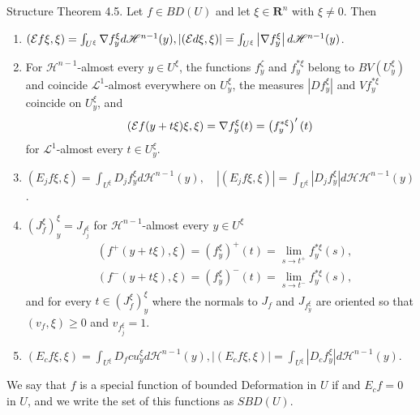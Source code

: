 \begin{theorem}
Structure Theorem 4.5. Let $f \in B D(U)$ and let $\xi \in \mathbf{R}^n$ with $\xi \neq 0$. Then
\begin{enumerate}
\item $\left( {\mathcal E} f \xi, \xi\right)=\int_{U^{\xi}} \nabla f_y^{\xi} d \mathscr{H}^{n-1}(y),\left|\left({\mathcal E} d \xi, \xi\right)\right|=\int_{U^{\xi}}\left|\nabla f_y^{\xi}\right| d \mathscr{H}^{n-1}(y)$.

\item For $\mathscr{H}^{n-1}$-almost every $y \in U^{\xi}$, the functions $f_y^\zeta$ and $f_y^{*\xi}$ belong to $B V\left(U_y^{\xi}\right)$ and coincide $\mathscr{L}^1$-almost everywhere on $U_y^{\xi}$, the measures $\left|D f_y^{\xi}\right|$ and $V f_y^{*\xi}$ coincide on $U_y^{\xi}$, and $$({\mathcal E} f(y+t \xi) \xi, \xi)=\nabla f_y^{\xi}(t)=\left(f_y^{*\xi}\right)^{\prime}(t)$$ for $\mathscr{L}^1$-almost every $t \in U_y^{\xi}$.
\item $\left(E_j f \xi, \xi\right)=\int_{U^{\xi}} D_j f_y^{\xi} d \mathscr{H}^{n-1}(y), \quad\left|\left(E_j f \xi, \xi\right)\right|=\int_{U^{\xi}}\left|D_j f_y^{\xi}\right| d \mathscr{H} \mathscr{H}^{n-1}(y)$.
\item $\left(J_f^{\xi}\right)_y^{\xi}=J_{f_j^{\xi}}$ for $\mathscr{H}^{n-1}$-almost every $y \in U^{\xi}$
$$
\begin{aligned}
&\left(f^{+}(y+t \xi), \xi\right)=\left(f_y^{\xi}\right)^{+}(t)=\lim _{s \rightarrow t^{+}} f_y^{*\xi}(s), \\
&\left(f^{-}(y+t \xi), \xi\right)=\left(f_y^{\xi}\right)^{-}(t)=\lim _{s \rightarrow t^{-}} f_y^{*\xi}(s),
\end{aligned}
$$
and for every $t \in\left(J_f^{\xi}\right)_y^{\xi}$ where the normals to $J_f$ and $J_{f_y^{\xi}}$ are oriented so that $\left(v_f, \xi\right) \geq 0$ and $v_{f_j^{\xi}}=1$.
\item $\left(E_c f \xi, \xi\right)=\int_{U^{\xi}} D_fc u_y^{\xi} d \mathscr{H}^{n-1}(y),\left|\left(E_c f \xi, \xi\right)\right|=\int_{U^{\xi}}\left|D_c f_y^{\xi}\right| d \mathscr{H}^{n-1}(y)$.
\end{enumerate}
\end{theorem}


We say that $f$ is a special function of bounded Deformation in $U$ if and $E _cf=0$ in $U$, and  we write the set of this functions as $S B D(U)$. 

